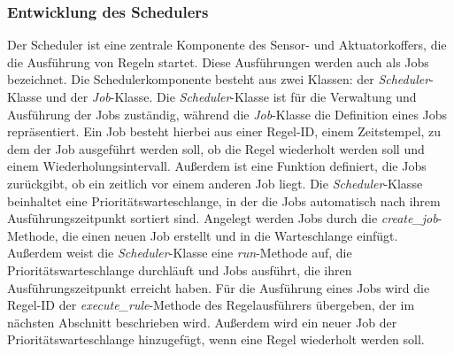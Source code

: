 \subsubsection{Entwicklung des Schedulers}
Der Scheduler ist eine zentrale Komponente des Sensor- und Aktuatorkoffers, die die Ausführung von Regeln startet.
Diese Ausführungen werden auch als Jobs bezeichnet.
Die Schedulerkomponente besteht aus zwei Klassen: der \emph{Scheduler}-Klasse und der \emph{Job}-Klasse.
Die \emph{Scheduler}-Klasse ist für die Verwaltung und Ausführung der Jobs zuständig, während die \emph{Job}-Klasse die Definition eines Jobs repräsentiert.
Ein Job besteht hierbei aus einer Regel-ID, einem Zeitstempel, zu dem der Job ausgeführt werden soll, ob die Regel wiederholt werden soll und einem Wiederholungsintervall.
Außerdem ist eine Funktion definiert, die Jobs zurückgibt, ob ein zeitlich vor einem anderen Job liegt.
Die \emph{Scheduler}-Klasse beinhaltet eine Prioritätswarteschlange, in der die Jobs automatisch nach ihrem Ausführungszeitpunkt sortiert sind.
Angelegt werden Jobs durch die \emph{create\_job}-Methode, die einen neuen Job erstellt und in die Warteschlange einfügt.
Außerdem weist die \emph{Scheduler}-Klasse eine \emph{run}-Methode auf, die Prioritätswarteschlange durchläuft und Jobs ausführt, die ihren Ausführungszeitpunkt erreicht haben.
Für die Ausführung eines Jobs wird die Regel-ID der \emph{execute\_rule}-Methode des Regelausführers übergeben, der im nächsten Abschnitt beschrieben wird.
Außerdem wird ein neuer Job der Prioritätswarteschlange hinzugefügt, wenn eine Regel wiederholt werden soll.


